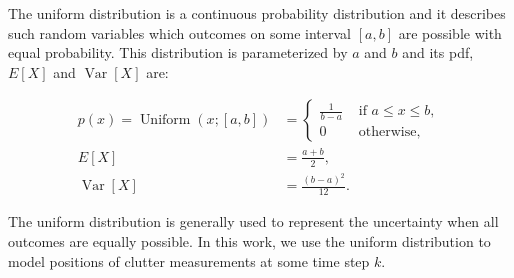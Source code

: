 The uniform distribution is a continuous probability distribution and it
describes such random variables which outcomes on some interval $[a, b]$
are possible with equal probability. This distribution is parameterized by
$a$ and $b$ and its pdf, $E[X]$ and $\operatorname{Var}[X]$ are:

$$
\begin{aligned}
    p(x)
        =\operatorname{Uniform}(x; [a, b])
        &= \begin{cases}
            \frac{1}{b-a} & \text { if } a \leq x \leq b, \\
            0 & \text { otherwise, }
        \end{cases} \\
    E[X] &= \frac{a + b}{2}, \\
    \operatorname{Var}[X] &= \frac{(b - a)^2}{12}.
\end{aligned}
$$

The uniform distribution is generally used to represent the uncertainty when
all outcomes are equally possible. In this work, we use the uniform distribution
to model positions of clutter measurements at some time step $k$.
